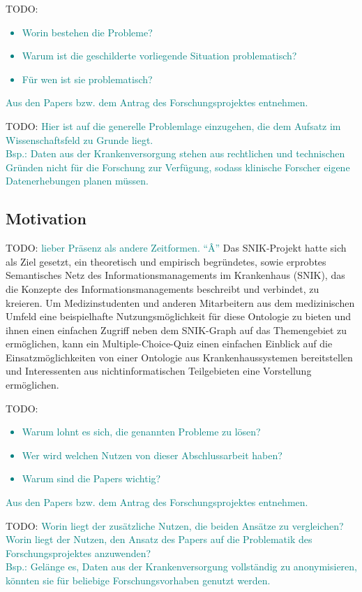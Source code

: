 \documentclass[headsepline,titlepage,ngerman,twoside,12pt]{report}
\newcommand\todo[1]{TODO: \textcolor{teal}{#1}}
\begin{document}
\todo{
\begin{itemize}
\item Worin bestehen die Probleme?
\item Warum ist die geschilderte vorliegende Situation problematisch?
\item Für wen ist sie problematisch?
\end{itemize}
Aus den Papers bzw. dem Antrag des Forschungsprojektes entnehmen.\\
}
\todo{
Hier ist auf die generelle Problemlage einzugehen, die dem Aufsatz im Wissenschaftsfeld zu Grunde liegt.\\
Bsp.: Daten aus der Krankenversorgung stehen aus rechtlichen und technischen Gründen nicht für die Forschung zur Verfügung, sodass klinische Forscher eigene Datenerhebungen planen müssen.
}
\subsection{Motivation}
\todo{lieber Präsenz als andere Zeitformen. \enquote{Â}}
Das SNIK-Projekt hatte sich als Ziel gesetzt, ein theoretisch und empirisch begründetes, sowie erprobtes Semantisches Netz des Informationsmanagements im Krankenhaus (SNIK), das die Konzepte des Informationsmanagements beschreibt und verbindet, zu kreieren.
Um Medizinstudenten und anderen Mitarbeitern aus dem medizinischen Umfeld eine beispielhafte Nutzungsmöglichkeit für diese Ontologie zu bieten und ihnen einen einfachen Zugriff neben dem SNIK-Graph auf das Themengebiet zu ermöglichen, kann ein Multiple-Choice-Quiz einen einfachen Einblick auf die Einsatzmöglichkeiten von einer Ontologie aus Krankenhaussystemen bereitstellen und Interessenten aus nichtinformatischen Teilgebieten eine Vorstellung ermöglichen.

\todo{
\begin{itemize}
\item Warum lohnt es sich, die genannten Probleme zu lösen?
\item Wer wird welchen Nutzen von dieser Abschlussarbeit haben?
\item Warum sind die Papers wichtig?
\end{itemize}
Aus den Papers bzw. dem Antrag des Forschungsprojektes entnehmen.
}
\todo{
Worin liegt der zusätzliche Nutzen, die beiden Ansätze zu vergleichen? Worin liegt der Nutzen, den Ansatz des Papers auf die Problematik des Forschungsprojektes anzuwenden?\\
Bsp.: Gelänge es, Daten aus der Krankenversorgung vollständig zu anonymisieren, könnten sie für beliebige Forschungsvorhaben genutzt werden.
}
\end{document}
